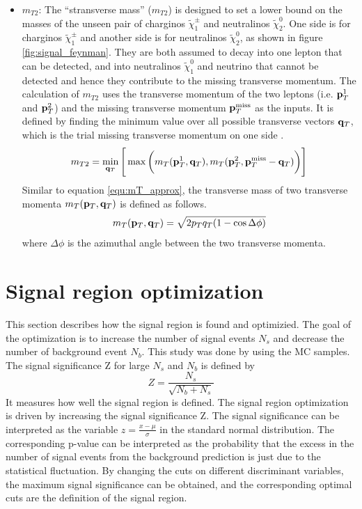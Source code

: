 \begin{itemize}
\item $m_{T2}$:
The ``stransverse mass'' ($m_{T2}$) is designed to set a lower bound on the masses of the unseen pair of charginos $\tilde{\chi}_1^\pm$ and neutralinos $\tilde{\chi}_2^0$.
One side is for charginos $\tilde{\chi}_1^\pm$ and another side is for neutralinos $\tilde{\chi}_2^0$, as shown in figure \ref{fig:signal_feynman}.
They are both assumed to decay into one lepton that can be detected, and into neutralinos $\tilde{\chi}_1^0$ and neutrino that cannot be detected and hence they contribute to the missing transverse momentum.
The calculation of $m_{T2}$ uses the transverse momentum of the two leptons (i.e. ${\bf p}_T^1$ and ${\bf p}_T^2$) and the missing transverse momentum ${\bf p}_T^{\text{miss}}$ as the inputs.
It is defined by finding the minimum value over all possible transverse vectors ${\bf q}_T$, which is the trial missing transverse momentum on one side \cite{MT2}.
\begin{equation}
m_{T2} = \min_{{\bf q}_T} \Bigg[ \max \bigg( m_T( {\bf p}_T^1, {\bf q}_T ), m_T( {\bf p}_T^2, {\bf p}_T^{\text{miss}} - {\bf q}_T ) \bigg) \Bigg]
\end{equation}
Similar to equation \ref{equ:mT_approx}, the transverse mass of two transverse momenta $m_T( {\bf p}_T, {\bf q}_T )$ is defined as follows.
\begin{equation}
m_T( {\bf p}_T, {\bf q}_T ) = \sqrt{ 2 p_T q_T ( 1 - \cos{\Delta\phi} ) }
\end{equation}
where $\Delta\phi$ is the azimuthal angle between the two transverse momenta.
\end{itemize}

\section{Signal region optimization}
\label{sec:signal_region_optimization}
This section describes how the signal region is found and optimizied.
The goal of the optimization is to increase the number of signal events $N_s$ and decrease the number of background event $N_b$.
This study was done by using the MC samples.
The signal significance Z for large $N_s$ and $N_b$ is defined by
\begin{equation}
Z = \frac{N_s}{\sqrt{N_b + N_s}}
\label{equ:simple_significance}
\end{equation}
It measures how well the signal region is defined.
The signal region optimization is driven by increasing the signal significance Z.
The signal significance can be interpreted as the variable $z = \frac{x-\mu}{\sigma}$ in the standard normal distribution.
The corresponding p-value can be interpreted as the probability that the excess in the number of signal events from the background prediction is just due to the statistical fluctuation.
By changing the cuts on different discriminant variables, the maximum signal significance can be obtained, and the corresponding optimal cuts are the definition of the signal region.

